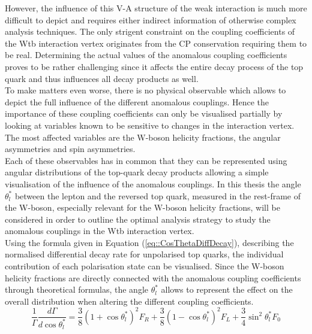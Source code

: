 However, the influence of this V-A structure of the weak interaction is much more difficult to depict and requires either indirect information of otherwise complex analysis techniques. The only strigent constraint on the coupling coefficients of the Wtb interaction vertex originates from the CP conservation %
requiring them to be real.
Determining the actual values of the anomalous coupling coefficients proves to be rather challenging since it affects the entire decay process of the top quark and thus influences all decay products as well.
\\
To make matters even worse, there is no physical observable which allows to depict the full influence of the different anomalous couplings. Hence the importance of these coupling coefficients can only be visualised partially by looking at variables known to be sensitive to changes in the interaction vertex. The most affected variables are the W-boson helicity fractions, the angular asymmetries and spin asymmetries.
\\
Each of these observables has in common that they can be represented using angular distributions of the top-quark decay products allowing a simple visualisation of the influence of the anomalous couplings. In this thesis the angle $\theta_{l}^{*}$ between the lepton and the reversed top quark, measured in the rest-frame of the W-boson, especially relevant for the W-boson helicity fractions, will be considered in order to outline the optimal analysis strategy to study the anomalous couplings in the Wtb interaction vertex.
\\
Using the formula given in Equation (\ref{eq::CosThetaDiffDecay}), describing the normalised differential decay rate for unpolarised top quarks, the individual contribution of each polarisation state can be visualised. Since the W-boson helicity fractions are directly connected with the anomalous coupling coefficients through theoretical formulas, the angle $\theta_{l}^{*}$ allows to represent the effect on the overall distribution when altering the different coupling coefficients.
\begin{equation} \label{eq::CosThetaDiffDecay}
 \frac{1}{\Gamma} \frac{d\Gamma}{d\cos \theta_{l}^{*}} = \frac{3}{8} (1 + \cos \theta_{l}^{*})^{2} F_R +  \frac{3}{8} (1 - \cos \theta_{l}^{*})^{2} F_L + \frac{3}{4} \sin^{2} \theta_{l}^{*} F_0
\end{equation}


